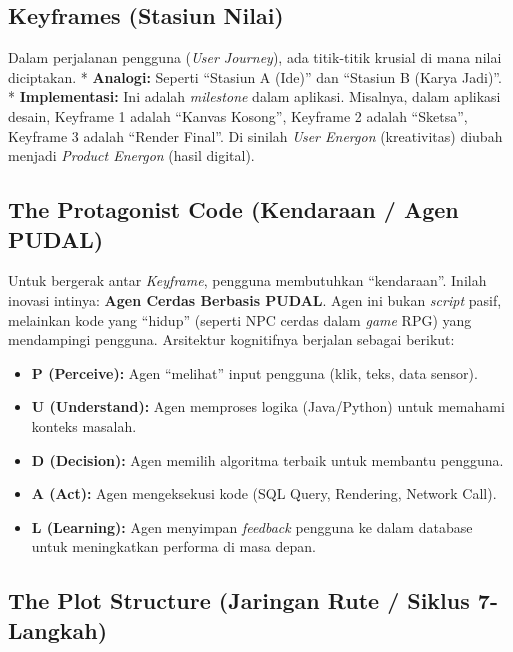 \documentclass[
  letterpaper,
  DIV=11,
  numbers=noendperiod]{scrreprt}
\providecommand{\tightlist}{%
  \setlength{\itemsep}{0pt}\setlength{\parskip}{0pt}}
\begin{document}
\subsection{Keyframes (Stasiun Nilai)}\label{keyframes-stasiun-nilai}

Dalam perjalanan pengguna (\emph{User Journey}), ada titik-titik krusial
di mana nilai diciptakan. * \textbf{Analogi:} Seperti ``Stasiun A
(Ide)'' dan ``Stasiun B (Karya Jadi)''. * \textbf{Implementasi:} Ini
adalah \emph{milestone} dalam aplikasi. Misalnya, dalam aplikasi desain,
Keyframe 1 adalah ``Kanvas Kosong'', Keyframe 2 adalah ``Sketsa'',
Keyframe 3 adalah ``Render Final''. Di sinilah \emph{User Energon}
(kreativitas) diubah menjadi \emph{Product Energon} (hasil digital).

\subsection{The Protagonist Code (Kendaraan / Agen
PUDAL)}\label{the-protagonist-code-kendaraan-agen-pudal}

Untuk bergerak antar \emph{Keyframe}, pengguna membutuhkan
``kendaraan''. Inilah inovasi intinya: \textbf{Agen Cerdas Berbasis
PUDAL}. Agen ini bukan \emph{script} pasif, melainkan kode yang
``hidup'' (seperti NPC cerdas dalam \emph{game} RPG) yang mendampingi
pengguna. Arsitektur kognitifnya berjalan sebagai berikut:

\begin{itemize}
\tightlist
\item
  \textbf{P (Perceive):} Agen ``melihat'' input pengguna (klik, teks,
  data sensor).
\item
  \textbf{U (Understand):} Agen memproses logika (Java/Python) untuk
  memahami konteks masalah.
\item
  \textbf{D (Decision):} Agen memilih algoritma terbaik untuk membantu
  pengguna.
\item
  \textbf{A (Act):} Agen mengeksekusi kode (SQL Query, Rendering,
  Network Call).
\item
  \textbf{L (Learning):} Agen menyimpan \emph{feedback} pengguna ke
  dalam database untuk meningkatkan performa di masa depan.
\end{itemize}

\subsection{The Plot Structure (Jaringan Rute / Siklus
7-Langkah)}\label{the-plot-structure-jaringan-rute-siklus-7-langkah}
\end{document}
